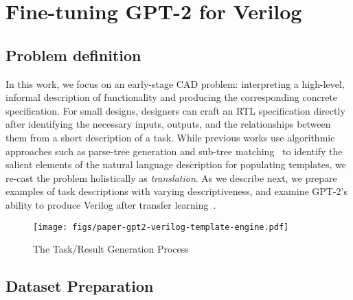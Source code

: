 \section{Fine-tuning GPT-2 for Verilog}
\label{sec:experiment}

\subsection{Problem definition}

In this work, we focus on an early-stage \ac{CAD} problem: interpreting a high-level, informal description of functionality and producing the corresponding concrete specification. 
For small designs, designers can craft an RTL specification directly after identifying the necessary inputs, outputs, and the relationships between them from a short description of a task.
While previous works use algorithmic approaches such as parse-tree generation and sub-tree matching~\cite{zhao_automatic_2019} to identify the salient elements of the natural language description for populating templates, we re-cast the problem holistically as \textit{translation}.
As we describe next, we prepare examples of task descriptions with varying descriptiveness, and examine GPT-2's ability to produce Verilog after transfer learning~\cite{pan_survey_2010}. 
\begin{figure}[t]
    \centering
    \texttt{[image: figs/paper-gpt2-verilog-template-engine.pdf]}
    \caption{The Task/Result Generation Process \label{fig:task-result-gen-process}}
    \vspace{-5mm}
\end{figure}

\subsection{Dataset Preparation}
\label{sec:dataset-prep}




